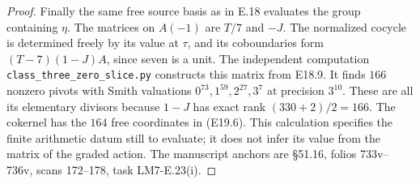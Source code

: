 \documentclass[11pt,oneside]{article}
\begin{document}
\begin{proof}
Finally the same free source basis as in
E.18 evaluates the group containing $\eta$.
The matrices on $A(-1)$ are $T/7$ and
$-J$. The normalized cocycle is determined
freely by its value at $\tau$, and its
coboundaries form
$(T-7)(1-J)A$, since seven is a unit.
The independent computation
\texttt{class\_three\_zero\_slice.py}
constructs this matrix from E18.9. It finds
$166$ nonzero pivots with Smith valuations
$0^{73},1^{59},2^{27},3^7$ at precision
$3^{10}$. These are all its elementary
divisors because $1-J$ has exact rank
$(330+2)/2=166$. The cokernel has the
$164$ free coordinates in (E19.6).
This calculation specifies the finite
arithmetic datum still to evaluate; it
does not infer its value from the matrix
of the graded action. The manuscript
anchors are \S51.16, folios 733v--736v,
scans 172--178, task LM7-E.23(i).
\end{proof}
\end{document}
